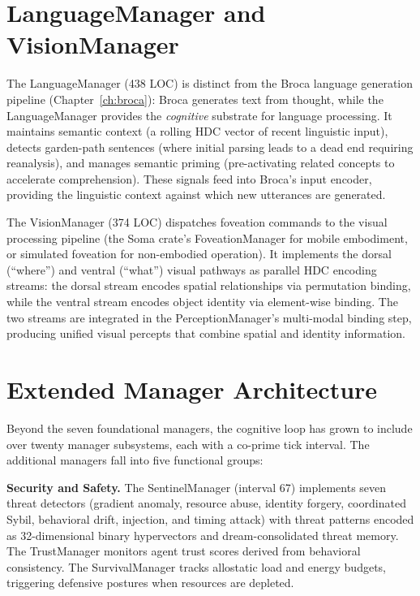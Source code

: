 \documentclass[12pt]{book}
\begin{document}
\section{LanguageManager and VisionManager}

The LanguageManager (438 LOC) is distinct from the Broca language generation pipeline (Chapter~\ref{ch:broca}): Broca generates text from thought, while the LanguageManager provides the \textit{cognitive} substrate for language processing. It maintains semantic context (a rolling HDC vector of recent linguistic input), detects garden-path sentences (where initial parsing leads to a dead end requiring reanalysis), and manages semantic priming (pre-activating related concepts to accelerate comprehension). These signals feed into Broca's input encoder, providing the linguistic context against which new utterances are generated.

The VisionManager (374 LOC) dispatches foveation commands to the visual processing pipeline (the Soma crate's FoveationManager for mobile embodiment, or simulated foveation for non-embodied operation). It implements the dorsal (``where'') and ventral (``what'') visual pathways as parallel HDC encoding streams: the dorsal stream encodes spatial relationships via permutation binding, while the ventral stream encodes object identity via element-wise binding. The two streams are integrated in the PerceptionManager's multi-modal binding step, producing unified visual percepts that combine spatial and identity information.


\section{Extended Manager Architecture}
\label{sec:extended-managers}

Beyond the seven foundational managers, the cognitive loop has grown to include over twenty manager subsystems, each with a co-prime tick interval. The additional managers fall into five functional groups:

\textbf{Security and Safety.} The SentinelManager (interval 67) implements seven threat detectors (gradient anomaly, resource abuse, identity forgery, coordinated Sybil, behavioral drift, injection, and timing attack) with threat patterns encoded as 32-dimensional binary hypervectors and dream-consolidated threat memory. The TrustManager monitors agent trust scores derived from behavioral consistency. The SurvivalManager tracks allostatic load and energy budgets, triggering defensive postures when resources are depleted.
\end{document}
